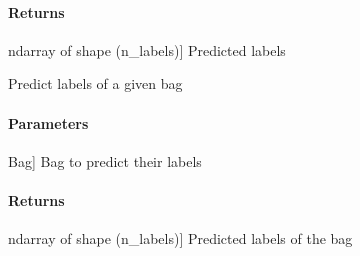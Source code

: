 \documentclass[letterpaper,10pt,english]{sphinxmanual}
\begin{document}
\begin{fulllineitems}
\begin{fulllineitems}
\begin{description}
\end{description}


\paragraph{Returns}
\label{\detokenize{classifier/mimlTOmi/_autosummary/miml.classifier.mimlTOmi.miml_to_mi_lp_classifier.MIMLtoMILPClassifier:id4}}\begin{description}
\sphinxlineitem{results}{[}ndarray of shape (n\_labels){]}
\sphinxAtStartPar
Predicted labels

\end{description}

\end{fulllineitems}


\begin{fulllineitems}
\label{\detokenize{classifier/mimlTOmi/_autosummary/miml.classifier.mimlTOmi.miml_to_mi_lp_classifier.MIMLtoMILPClassifier:miml.classifier.mimlTOmi.miml_to_mi_lp_classifier.MIMLtoMILPClassifier.predict_bag}}
\pysigstartsignatures
{}
\pysigstopsignatures
\sphinxAtStartPar
Predict labels of a given bag


\paragraph{Parameters}
\label{\detokenize{classifier/mimlTOmi/_autosummary/miml.classifier.mimlTOmi.miml_to_mi_lp_classifier.MIMLtoMILPClassifier:id5}}\begin{description}
\sphinxlineitem{bag}{[}Bag{]}
\sphinxAtStartPar
Bag to predict their labels

\end{description}


\paragraph{Returns}
\label{\detokenize{classifier/mimlTOmi/_autosummary/miml.classifier.mimlTOmi.miml_to_mi_lp_classifier.MIMLtoMILPClassifier:id6}}\begin{description}
\sphinxlineitem{results}{[}ndarray of shape (n\_labels){]}
\sphinxAtStartPar
Predicted labels of the bag


\end{description}
\end{fulllineitems}
\end{fulllineitems}
\end{document}
